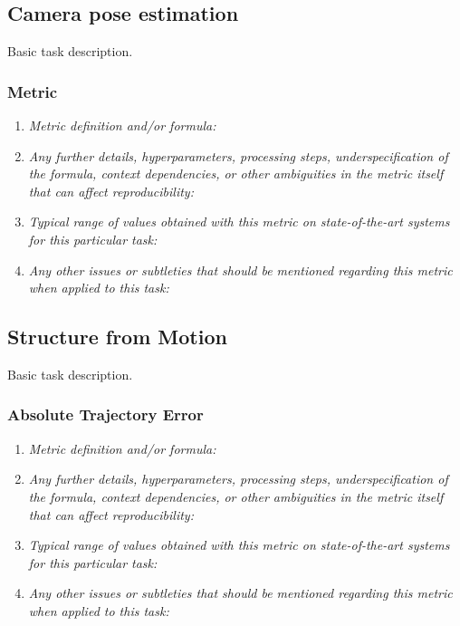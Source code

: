 \documentclass[a4paper,11pt]{article}
\begin{document}
    \subsection{Camera pose estimation}
        Basic task description.
        \subsubsection{Metric}
            \begin{enumerate}[label=\alph*.]
                \item \textit{Metric definition and/or formula:}
                \bigskip
                \item \textit{Any further details, hyperparameters, processing steps, underspecification of the formula, context dependencies, or other ambiguities in the metric itself that can affect reproducibility:}
                \bigskip
                \item \textit{Typical range of values obtained with this metric on state-of-the-art systems for this particular task:}
                \bigskip
                \item \textit{Any other issues or subtleties that should be mentioned regarding this metric when applied to this task:}
                \bigskip
            \end{enumerate}

    \subsection{Structure from Motion}
        Basic task description.
        \subsubsection{Absolute Trajectory Error}
            \begin{enumerate}[label=\alph*.]
                \item \textit{Metric definition and/or formula:}
                \bigskip
                \item \textit{Any further details, hyperparameters, processing steps, underspecification of the formula, context dependencies, or other ambiguities in the metric itself that can affect reproducibility:}
                \bigskip
                \item \textit{Typical range of values obtained with this metric on state-of-the-art systems for this particular task:}
                \bigskip
                \item \textit{Any other issues or subtleties that should be mentioned regarding this metric when applied to this task:}
                \bigskip
            \end{enumerate}
\end{document}

